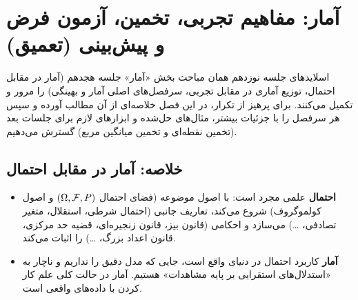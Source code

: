 \chapter{آمار: مفاهیم تجربی، تخمین، آزمون فرض و پیش‌بینی (تعمیق)}

\begin{note}
\notetitle اسلایدهای جلسه نوزدهم همان مباحث بخش «آمار» جلسه هجدهم (آمار در مقابل احتمال، توزیع آماری در مقابل تجربی، سرفصل‌های اصلی آمار و بهینگی) را مرور و تکمیل می‌کنند. برای پرهیز از تکرار، در این فصل خلاصه‌ای از آن مطالب آورده و سپس هر سرفصل را با جزئیات بیشتر، مثال‌های حل‌شده و ابزارهای لازم برای جلسات بعد (تخمین نقطه‌ای و تخمین میانگین مربع) گسترش می‌دهیم.
\end{note}

\section{خلاصه: آمار در مقابل احتمال}
\begin{itemize}
\item \textbf{احتمال} علمی مجرد است: با اصول موضوعه (فضای احتمال $(\Omega,\mathcal{F},P)$ و اصول کولموگروف) شروع می‌کند، تعاریف جانبی (احتمال شرطی، استقلال، متغیر تصادفی، \ldots) می‌سازد و احکامی (قانون بیز، قانون زنجیره‌ای، قضیه حد مرکزی، قانون اعداد بزرگ، \ldots) را اثبات می‌کند.
\item \textbf{آمار} کاربرد احتمال در دنیای واقع است، جایی که مدل دقیق را نداریم و ناچار به «استدلال‌های استقرایی بر پایه مشاهدات» هستیم. آمار در حالت کلی علم کار کردن با داده‌های واقعی است.
\end{itemize}

\begin{center}
\end{center}

